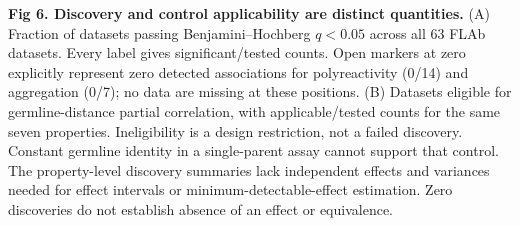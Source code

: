 \caption{{\bf Fig 6. Discovery and control applicability are distinct quantities.} (A) Fraction of datasets passing Benjamini--Hochberg $q<0.05$ across all 63 FLAb datasets. Every label gives significant/tested counts. Open markers at zero explicitly represent zero detected associations for polyreactivity (0/14) and aggregation (0/7); no data are missing at these positions. (B) Datasets eligible for germline-distance partial correlation, with applicable/tested counts for the same seven properties. Ineligibility is a design restriction, not a failed discovery. Constant germline identity in a single-parent assay cannot support that control. The property-level discovery summaries lack independent effects and variances needed for effect intervals or minimum-detectable-effect estimation. Zero discoveries do not establish absence of an effect or equivalence.}
